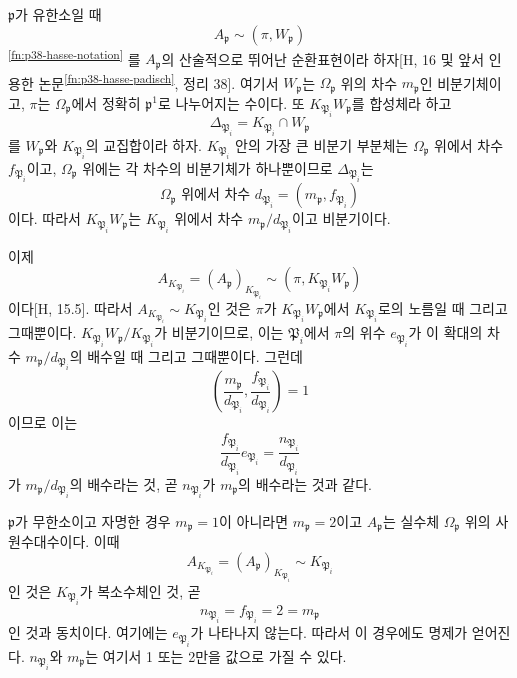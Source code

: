 \(\mathfrak p\)가 유한소일 때
\[
A_{\mathfrak p}\sim(\pi,W_{\mathfrak p})
\]
\textsuperscript{\ref{fn:p38-hasse-notation}}
를 \(A_{\mathfrak p}\)의 산술적으로 뛰어난 순환표현이라 하자[H, 16 및 앞서 인용한 논문\textsuperscript{\ref{fn:p38-hasse-padisch}}, 정리 38]. 여기서 \(W_{\mathfrak p}\)는 \(\Omega_{\mathfrak p}\) 위의 차수 \(m_{\mathfrak p}\)인 비분기체이고, \(\pi\)는 \(\Omega_{\mathfrak p}\)에서 정확히 \(\mathfrak p^1\)로 나누어지는 수이다. 또 \(K_{\mathfrak P_i}W_{\mathfrak p}\)를 합성체라 하고
\[
\Delta_{\mathfrak P_i}=K_{\mathfrak P_i}\cap W_{\mathfrak p}
\]
를 \(W_{\mathfrak p}\)와 \(K_{\mathfrak P_i}\)의 교집합이라 하자. \(K_{\mathfrak P_i}\) 안의 가장 큰 비분기 부분체는 \(\Omega_{\mathfrak p}\) 위에서 차수 \(f_{\mathfrak P_i}\)이고, \(\Omega_{\mathfrak p}\) 위에는 각 차수의 비분기체가 하나뿐이므로 \(\Delta_{\mathfrak P_i}\)는
\[
\Omega_{\mathfrak p}\text{ 위에서 차수 }
d_{\mathfrak P_i}=(m_{\mathfrak p},f_{\mathfrak P_i})
\]
이다. 따라서 \(K_{\mathfrak P_i}W_{\mathfrak p}\)는 \(K_{\mathfrak P_i}\) 위에서 차수 \(m_{\mathfrak p}/d_{\mathfrak P_i}\)이고 비분기이다.

이제
\[
A_{K_{\mathfrak P_i}}
=(A_{\mathfrak p})_{K_{\mathfrak P_i}}
\sim(\pi,K_{\mathfrak P_i}W_{\mathfrak p})
\]
이다[H, 15.5]. 따라서 \(A_{K_{\mathfrak P_i}}\sim K_{\mathfrak P_i}\)인 것은 \(\pi\)가 \(K_{\mathfrak P_i}W_{\mathfrak p}\)에서 \(K_{\mathfrak P_i}\)로의 노름일 때 그리고 그때뿐이다. \(K_{\mathfrak P_i}W_{\mathfrak p}/K_{\mathfrak P_i}\)가 비분기이므로, 이는 \(\mathfrak P_i\)에서 \(\pi\)의 위수 \(e_{\mathfrak P_i}\)가 이 확대의 차수 \(m_{\mathfrak p}/d_{\mathfrak P_i}\)의 배수일 때 그리고 그때뿐이다. 그런데
\[
\left(
\frac{m_{\mathfrak p}}{d_{\mathfrak P_i}},
\frac{f_{\mathfrak P_i}}{d_{\mathfrak P_i}}
\right)=1
\]
이므로 이는
\[
\frac{f_{\mathfrak P_i}}{d_{\mathfrak P_i}}e_{\mathfrak P_i}
=\frac{n_{\mathfrak P_i}}{d_{\mathfrak P_i}}
\]
가 \(m_{\mathfrak p}/d_{\mathfrak P_i}\)의 배수라는 것, 곧 \(n_{\mathfrak P_i}\)가 \(m_{\mathfrak p}\)의 배수라는 것과 같다.

\(\mathfrak p\)가 무한소이고 자명한 경우 \(m_{\mathfrak p}=1\)이 아니라면 \(m_{\mathfrak p}=2\)이고 \(A_{\mathfrak p}\)는 실수체 \(\Omega_{\mathfrak p}\) 위의 사원수대수이다. 이때
\[
A_{K_{\mathfrak P_i}}
=(A_{\mathfrak p})_{K_{\mathfrak P_i}}\sim K_{\mathfrak P_i}
\]
인 것은 \(K_{\mathfrak P_i}\)가 복소수체인 것, 곧
\[
n_{\mathfrak P_i}=f_{\mathfrak P_i}=2=m_{\mathfrak p}
\]
인 것과 동치이다. 여기에는 \(e_{\mathfrak P_i}\)가 나타나지 않는다. 따라서 이 경우에도 명제가 얻어진다. \(n_{\mathfrak P_i}\)와 \(m_{\mathfrak p}\)는 여기서 1 또는 2만을 값으로 가질 수 있다.

